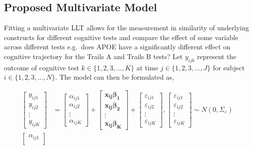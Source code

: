 \documentclass[
]{article}
\author{}
\date{\vspace{-2.5em}}
\begin{document}
\hypertarget{proposed-multivariate-model}{%
\subsection{Proposed Multivariate Model}\label{proposed-multivariate-model}}

Fitting a multivariate LLT allows for the measurement in similarity of underlying constructs for different cognitive tests and compare the effect of some variable across different tests e.g.~does APOE have a significantly different effect on cognitive trajectory for the Trails A and Trails B tests? Let \(y_{ijk}\) represent the outcome of cognitive test \(k\in \{1, 2, 3, ..., K\}\) at time \(j\in \{1, 2, 3, ..., J\}\) for subject \(i \in \{1, 2, 3, ..., N\}\). The model can then be formulated as,

\begin{equation*}
\begin{aligned}
\begin{bmatrix}
y_{ij1}\\
y_{ij2}\\
\vdots\\
y_{ijK}
\end{bmatrix}
&= \begin{bmatrix}
\alpha_{ij1}\\
\alpha_{ij2}\\
\vdots\\
\alpha_{ijK}
\end{bmatrix}
+ 
\begin{bmatrix}
\boldsymbol{x_{ij}\beta_1}\\
\boldsymbol{x_{ij}\beta_2}\\
\vdots\\
\boldsymbol{x_{ij}\beta_K} 
\end{bmatrix} +
\begin{bmatrix}
\varepsilon_{ij1}\\
\varepsilon_{ij2}\\
\vdots\\
\varepsilon_{ijK}
\end{bmatrix},  
\begin{bmatrix}
\varepsilon_{ij1}\\
\varepsilon_{ij2}\\
\vdots\\
\varepsilon_{ijK}
\end{bmatrix} 
\sim N(0, \Sigma_\varepsilon
)\\
\begin{bmatrix}
\alpha_{ij1}\\

\end{bmatrix}
\end{aligned}
\end{equation*}
\end{document}
